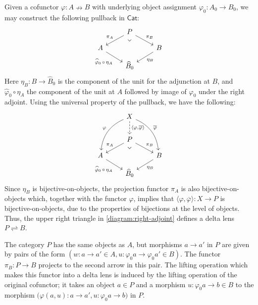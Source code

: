 \documentclass[colorlinks = true, a4paper, oneside, reqno, 11pt]{amsart}
\theoremstyle{definition}
\theoremstyle{remark}
\newcommand{\Cat}{\mathsf{Cat}}
\newcommand{\phibar}{\overline{\varphi}}
\begin{document}
Given a cofunctor $\varphi \colon A \nrightarrow B$ with underlying object assignment 
$\varphi_{0} \colon A_{0} \rightarrow B_{0}$, we may construct the following pullback 
in $\Cat$: 
\begin{equation}
\begin{tikzcd}[row sep = small]
& P
\arrow[ld, "\pi_{A}"']
\arrow[rd, "\pi_{B}"]
\arrow[dd, phantom, "\lrcorner" rotate = -45, very near start]
& \\
A 
\arrow[rd, "\widehat{\varphi}_{0} \, \circ \, \eta_{A}"']
& & B
\arrow[ld, "\eta_{B}"]
\\
& \widehat{B}_{0}
&
\end{tikzcd}
\end{equation} 
Here $\eta_{B} \colon B \rightarrow \widehat{B}_{0}$ is the component of the unit 
for the adjunction at $B$, and $\widehat{\varphi}_{0} \circ \eta_{A}$ the component of 
the unit at $A$ followed by image of $\varphi_{0}$ under the right adjoint. 
Using the universal property of the pullback, we have the following: 
\begin{equation}\label{diagram:right-adjoint}
\begin{tikzcd}[row sep = small]
& X 
\arrow[ldd, bend right, "\varphi"']
\arrow[rdd, bend left, "\phibar"]
\arrow[d, dashed, "{\langle \varphi, \phibar \rangle}"]
& 
\\[+1em]
& P
\arrow[ld, "\pi_{A}"']
\arrow[rd, "\pi_{B}"]
\arrow[dd, phantom, "\lrcorner" rotate = -45, very near start]
& \\
A 
\arrow[rd, "\widehat{\varphi}_{0} \, \circ \, \eta_{A}"']
& & B
\arrow[ld, "\eta_{B}"]
\\
& \widehat{B}_{0}
&
\end{tikzcd}
\end{equation}
Since $\eta_{B}$ is bijective-on-objects, the projection functor $\pi_{A}$ is also
bijective-on-objects which, together with the functor $\varphi$, implies that
$\langle \varphi, \phibar \rangle \colon X \rightarrow P$ is bijective-on-objects,
due to the properties of bijections at the level of objects.
Thus, the upper right triangle in \eqref{diagram:right-adjoint} defines a delta lens 
$P \rightleftharpoons B$. 

The category $P$ has the same objects as $A$, but morphisms $a \rightarrow a'$ in $P$ 
are given by pairs of 
the form $(w \colon a \rightarrow a' \in A, u \colon \varphi_{0}a \rightarrow \varphi_{0}a' \in B)$. 
The functor $\pi_{B} \colon P \rightarrow B$ projects to the second arrow in this 
pair. 
The lifting operation which makes this functor into a delta lens is induced by the 
lifting operation of the original cofunctor; it takes an object $a \in P$ and 
a morphism $u \colon \varphi_{0}a \rightarrow b \in B$ to the morphism 
$\big( \varphi(a, u) \colon a \rightarrow a', u \colon \varphi_{0}a \rightarrow b \big)$ in 
$P$. 
\end{document}
